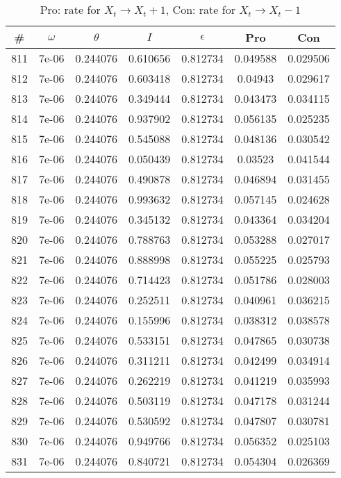 \newpage
\begin{table}
\caption{Pro: rate for $X_t \rightarrow X_t + 1$, Con: rate for $X_t \rightarrow X_t - 1$}
\begin{tabular*}{\linewidth}{c|c|c|c|c|c|c}
\# & $\omega$ & $\theta$ & $I$ & $\epsilon$ & Pro & Con \\
\hline
811 & 7e-06 & 0.244076 & 0.610656 & 0.812734 & 0.049588 & 0.029506\\
812 & 7e-06 & 0.244076 & 0.603418 & 0.812734 & 0.04943 & 0.029617\\
813 & 7e-06 & 0.244076 & 0.349444 & 0.812734 & 0.043473 & 0.034115\\
814 & 7e-06 & 0.244076 & 0.937902 & 0.812734 & 0.056135 & 0.025235\\
815 & 7e-06 & 0.244076 & 0.545088 & 0.812734 & 0.048136 & 0.030542\\
816 & 7e-06 & 0.244076 & 0.050439 & 0.812734 & 0.03523 & 0.041544\\
817 & 7e-06 & 0.244076 & 0.490878 & 0.812734 & 0.046894 & 0.031455\\
818 & 7e-06 & 0.244076 & 0.993632 & 0.812734 & 0.057145 & 0.024628\\
819 & 7e-06 & 0.244076 & 0.345132 & 0.812734 & 0.043364 & 0.034204\\
820 & 7e-06 & 0.244076 & 0.788763 & 0.812734 & 0.053288 & 0.027017\\
821 & 7e-06 & 0.244076 & 0.888998 & 0.812734 & 0.055225 & 0.025793\\
822 & 7e-06 & 0.244076 & 0.714423 & 0.812734 & 0.051786 & 0.028003\\
823 & 7e-06 & 0.244076 & 0.252511 & 0.812734 & 0.040961 & 0.036215\\
824 & 7e-06 & 0.244076 & 0.155996 & 0.812734 & 0.038312 & 0.038578\\
825 & 7e-06 & 0.244076 & 0.533151 & 0.812734 & 0.047865 & 0.030738\\
826 & 7e-06 & 0.244076 & 0.311211 & 0.812734 & 0.042499 & 0.034914\\
827 & 7e-06 & 0.244076 & 0.262219 & 0.812734 & 0.041219 & 0.035993\\
828 & 7e-06 & 0.244076 & 0.503119 & 0.812734 & 0.047178 & 0.031244\\
829 & 7e-06 & 0.244076 & 0.530592 & 0.812734 & 0.047807 & 0.030781\\
830 & 7e-06 & 0.244076 & 0.949766 & 0.812734 & 0.056352 & 0.025103\\
831 & 7e-06 & 0.244076 & 0.840721 & 0.812734 & 0.054304 & 0.026369\\

\end{tabular*}
\end{table}
